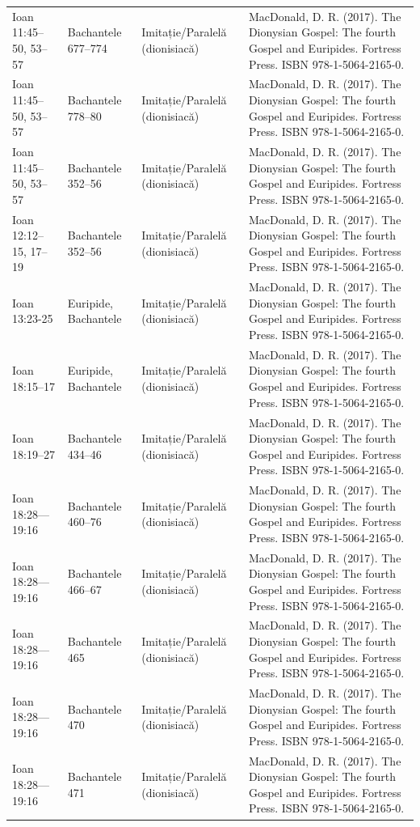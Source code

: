 \documentclass[12pt,a4paper,twoside,openany]{book}
\begin{document}
\begin{longtable}{L{1.4cm}L{1.7cm}L{3.1cm}L{8.4cm}}
Ioan 11:45–50, 53–57 & Bachantele 677–774 & Imitație/Paralelă (dionisiacă) & MacDonald, D. R. (2017). The Dionysian Gospel: The fourth Gospel and Euripides. Fortress Press. ISBN 978-1-5064-2165-0. \\
Ioan 11:45–50, 53–57 & Bachantele 778–80 & Imitație/Paralelă (dionisiacă) & MacDonald, D. R. (2017). The Dionysian Gospel: The fourth Gospel and Euripides. Fortress Press. ISBN 978-1-5064-2165-0. \\
Ioan 11:45–50, 53–57 & Bachantele 352–56 & Imitație/Paralelă (dionisiacă) & MacDonald, D. R. (2017). The Dionysian Gospel: The fourth Gospel and Euripides. Fortress Press. ISBN 978-1-5064-2165-0. \\
Ioan 12:12–15, 17–19 & Bachantele 352–56 & Imitație/Paralelă (dionisiacă) & MacDonald, D. R. (2017). The Dionysian Gospel: The fourth Gospel and Euripides. Fortress Press. ISBN 978-1-5064-2165-0. \\
Ioan 13:23-25 & Euripide, Bachantele & Imitație/Paralelă (dionisiacă) & MacDonald, D. R. (2017). The Dionysian Gospel: The fourth Gospel and Euripides. Fortress Press. ISBN 978-1-5064-2165-0. \\
Ioan 18:15–17 & Euripide, Bachantele & Imitație/Paralelă (dionisiacă) & MacDonald, D. R. (2017). The Dionysian Gospel: The fourth Gospel and Euripides. Fortress Press. ISBN 978-1-5064-2165-0. \\
Ioan 18:19–27 & Bachantele 434–46 & Imitație/Paralelă (dionisiacă) & MacDonald, D. R. (2017). The Dionysian Gospel: The fourth Gospel and Euripides. Fortress Press. ISBN 978-1-5064-2165-0. \\
Ioan 18:28—19:16 & Bachantele 460–76 & Imitație/Paralelă (dionisiacă) & MacDonald, D. R. (2017). The Dionysian Gospel: The fourth Gospel and Euripides. Fortress Press. ISBN 978-1-5064-2165-0. \\
Ioan 18:28—19:16 & Bachantele 466–67 & Imitație/Paralelă (dionisiacă) & MacDonald, D. R. (2017). The Dionysian Gospel: The fourth Gospel and Euripides. Fortress Press. ISBN 978-1-5064-2165-0. \\
Ioan 18:28—19:16 & Bachantele 465 & Imitație/Paralelă (dionisiacă) & MacDonald, D. R. (2017). The Dionysian Gospel: The fourth Gospel and Euripides. Fortress Press. ISBN 978-1-5064-2165-0. \\
Ioan 18:28—19:16 & Bachantele 470 & Imitație/Paralelă (dionisiacă) & MacDonald, D. R. (2017). The Dionysian Gospel: The fourth Gospel and Euripides. Fortress Press. ISBN 978-1-5064-2165-0. \\
Ioan 18:28—19:16 & Bachantele 471 & Imitație/Paralelă (dionisiacă) & MacDonald, D. R. (2017). The Dionysian Gospel: The fourth Gospel and Euripides. Fortress Press. ISBN 978-1-5064-2165-0. \\

\end{longtable}
\end{document}
